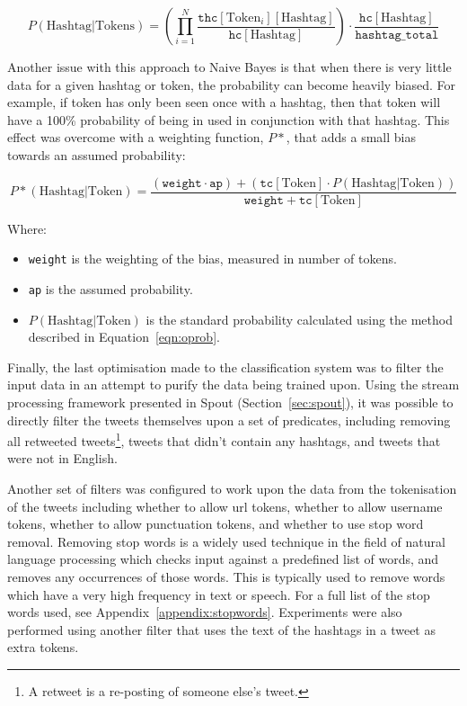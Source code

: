 \documentclass[11pt,a4paper]{report}
\begin{document}
\begin{equation}
    P(\text{Hashtag}|\text{Tokens}) = \left(\prod\limits_{i=1}^{N} \frac{\mathtt{thc}[\text{Token}_i][\text{Hashtag}]}{\mathtt{hc}[\text{Hashtag}]}\right) \cdot \frac{\mathtt{hc}[\text{Hashtag}]}{\mathtt{hashtag\_total}}\label{eqn:oprob}
\end{equation}

Another issue with this approach to Naive Bayes is that when there is very little data for a given hashtag or token, the probability can become heavily biased. For example, if token has only been seen once with a hashtag, then that token will have a 100\% probability of being in used in conjunction with that hashtag. This effect was overcome with a weighting function, $P*$, that adds a small bias towards an assumed probability:

\begin{equation}
    P*(\text{Hashtag}|\text{Token}) = \frac{(\mathtt{weight} \cdot \mathtt{ap}) + (\mathtt{tc}[\text{Token}] \cdot P(\text{Hashtag}|\text{Token}))}{\mathtt{weight} + \mathtt{tc}[\text{Token}]}
\end{equation}

Where:
\begin{itemize}
    \item \texttt{weight} is the weighting of the bias, measured in number of tokens.
    \item \texttt{ap} is the assumed probability.
    \item $P(\text{Hashtag}|\text{Token})$ is the standard probability calculated using the method described in Equation~\ref{eqn:oprob}.
\end{itemize}

Finally, the last optimisation made to the classification system was to filter the input data in an attempt to purify the data being trained upon. Using the stream processing framework presented in Spout (Section~\ref{sec:spout}), it was possible to directly filter the tweets themselves upon a set of predicates, including removing all retweeted tweets\footnote{A retweet is a re-posting of someone else's tweet.}, tweets that didn't contain any hashtags, and tweets that were not in English.

Another set of filters was configured to work upon the data from the tokenisation of the tweets including whether to allow url tokens, whether to allow username tokens, whether to allow punctuation tokens, and whether to use stop word removal. Removing stop words is a widely used technique in the field of natural language processing which checks input against a predefined list of words, and removes any occurrences of those words. This is typically used to remove words which have a very high frequency in text or speech. For a full list of the stop words used, see Appendix~\ref{appendix:stopwords}. Experiments were also performed using another filter that uses the text of the hashtags in a tweet as extra tokens.
\end{document}
